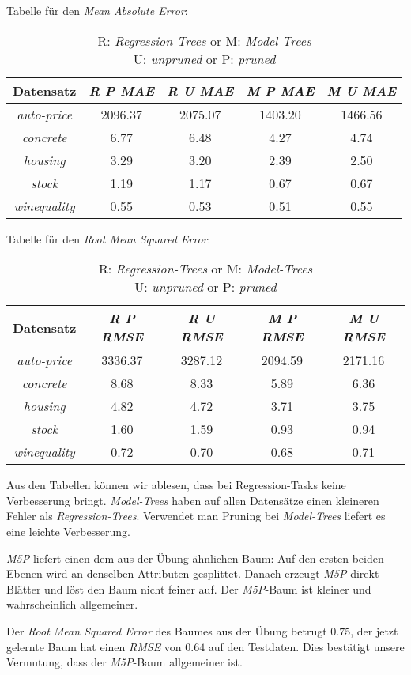 
Tabelle f\"ur den \emph{Mean Absolute Error}:

\begin{table}
\begin{tabular}{c|c|c|c|c}
Datensatz  & \emph{R P MAE } & \emph{R U MAE} & \emph{M P MAE} & \emph{M U MAE} \\ \hline
\emph{auto-price}  & 2096.37 & 2075.07& 1403.20 & 1466.56 \\ \hline
\emph{concrete}    & 6.77    & 6.48   & 4.27    & 4.74     \\ \hline
\emph{housing}     & 3.29    & 3.20   & 2.39    & 2.50     \\ \hline
\emph{stock}       & 1.19    & 1.17   & 0.67    & 0.67     \\ \hline
\emph{winequality} & 0.55    & 0.53   & 0.51    & 0.55       
\end{tabular}
\caption{R: \emph{Regression-Trees} or M: \emph{Model-Trees} \\
U: \emph{unpruned} or P: \emph{pruned} }
\end{table}


Tabelle für den \emph{Root Mean Squared Error}:

\begin{table}
\begin{tabular}{c|c|c|c|c}
Datensatz  & \emph{R P RMSE} & \emph{R U RMSE} & \emph{M P RMSE} & \emph{M U RMSE} \\ \hline
\emph{auto-price}  & 3336.37  & 3287.12 & 2094.59 & 2171.16 \\ \hline
\emph{concrete}    & 8.68 & 8.33 & 5.89 & 6.36 \\ \hline
\emph{housing}     & 4.82 & 4.72 & 3.71 & 3.75 \\ \hline
\emph{stock}       & 1.60 & 1.59 & 0.93 & 0.94 \\ \hline
\emph{winequality} & 0.72 & 0.70 & 0.68 & 0.71   
\end{tabular}
\caption{R: \emph{Regression-Trees} or M: \emph{Model-Trees} \\
U: \emph{unpruned} or P: \emph{pruned} }
\end{table}


Aus den Tabellen k\"onnen wir ablesen, dass bei Regression-Tasks keine Verbesserung bringt. \emph{Model-Trees} haben auf allen Datens\"atze einen kleineren Fehler als \emph{Regression-Trees}. Verwendet man Pruning bei \emph{Model-Trees} liefert es eine leichte Verbesserung.


\emph{M5P} liefert einen dem aus der \"Ubung \"ahnlichen Baum: Auf den ersten beiden Ebenen wird an denselben Attributen gesplittet. Danach erzeugt \emph{M5P} direkt Bl\"atter und l\"ost den Baum  nicht feiner auf. Der \emph{M5P}-Baum ist kleiner und wahrscheinlich allgemeiner. 

Der \emph{Root Mean Squared Error} des Baumes aus der \"Ubung betrugt $0.75$, der jetzt gelernte Baum hat einen \emph{RMSE} von $0.64$ auf den Testdaten. Dies best\"atigt unsere Vermutung, dass der \emph{M5P}-Baum allgemeiner ist.